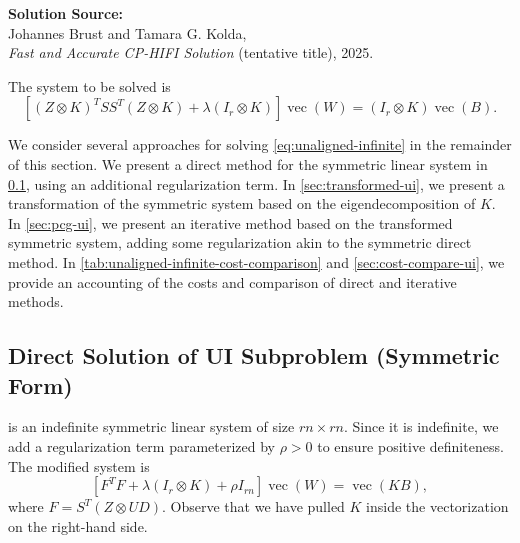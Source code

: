 \documentclass{article}
\DeclareMathOperator{\vecop}{vec}
\theoremstyle{plain} %
\begin{document}
\begin{center}
	\large
	\textbf{Solution Source:} \\
	Johannes Brust and Tamara G. Kolda,\\
	\emph{Fast and Accurate CP-HIFI Solution} (tentative title), 2025.
\end{center}

The system to be solved is
\begin{equation}\label{eq:unaligned-infinite} 
	\left[
    (Z \otimes K)^T S
    S^T (Z \otimes K)
    + \lambda (I_r \otimes K) 
  \right] \vecop(W)
	= (I_r \otimes K) 
	\vecop( B ).
\end{equation}

We consider several approaches for solving \cref{eq:unaligned-infinite} 
in the remainder of this section.
We present a direct method for the symmetric linear system in \cref{sec:direct-ui-sym},
using an additional regularization term.
In \cref{sec:transformed-ui}, we present a transformation of the symmetric system
based on the eigendecomposition of $K$.
In \cref{sec:pcg-ui}, we present an iterative method based on
the transformed symmetric system, adding some regularization akin to the symmetric direct method.
In \cref{tab:unaligned-infinite-cost-comparison} and \cref{sec:cost-compare-ui},
we provide an accounting of the costs and comparison of direct and iterative methods.

\subsection{Direct Solution of UI Subproblem (Symmetric Form)}
\label{sec:direct-ui-sym}

 is an indefinite 
symmetric linear system of size $rn \times rn$.
Since it is indefinite, 
we add a regularization term parameterized by $\rho > 0$ 
to ensure positive definiteness.
The modified system is
\begin{equation}\label{eq:unaligned-infinite-1}
	[ F^T F  + \lambda (I_r \otimes K) + \rho  I_{rn} ] \vecop(W)
	= \vecop(K B),
\end{equation}
where $F=S^T(Z \otimes UD)$.
Observe that we have pulled $K$ inside the vectorization on the right-hand side.
	
\end{document}
